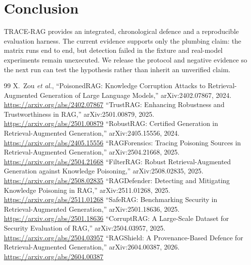 \documentclass[conference]{IEEEtran}
\begin{document}
\section{Conclusion}
TRACE-RAG provides an integrated, chronological defence and a reproducible
evaluation harness. The current evidence supports only the plumbing claim: the
matrix runs end to end, but detection failed in the fixture and real-model
experiments remain unexecuted. We release the protocol and negative evidence so
the next run can test the hypothesis rather than inherit an unverified claim.
\begin{thebibliography}{99}
 X.~Zou \emph{et al.}, ``PoisonedRAG: Knowledge Corruption Attacks to Retrieval-Augmented Generation of Large Language Models,'' arXiv:2402.07867, 2024. \url{https://arxiv.org/abs/2402.07867}
 ``TrustRAG: Enhancing Robustness and Trustworthiness in RAG,'' arXiv:2501.00879, 2025. \url{https://arxiv.org/abs/2501.00879}
 ``RobustRAG: Certified Generation in Retrieval-Augmented Generation,'' arXiv:2405.15556, 2024. \url{https://arxiv.org/abs/2405.15556}
 ``RAGForensics: Tracing Poisoning Sources in Retrieval-Augmented Generation,'' arXiv:2504.21668, 2025. \url{https://arxiv.org/abs/2504.21668}
 ``FilterRAG: Robust Retrieval-Augmented Generation against Knowledge Poisoning,'' arXiv:2508.02835, 2025. \url{https://arxiv.org/abs/2508.02835}
 ``RAGDefender: Detecting and Mitigating Knowledge Poisoning in RAG,'' arXiv:2511.01268, 2025. \url{https://arxiv.org/abs/2511.01268}
 ``SafeRAG: Benchmarking Security in Retrieval-Augmented Generation,'' arXiv:2501.18636, 2025. \url{https://arxiv.org/abs/2501.18636}
 ``CorruptRAG: A Large-Scale Dataset for Security Evaluation of RAG,'' arXiv:2504.03957, 2025. \url{https://arxiv.org/abs/2504.03957}
 ``RAGShield: A Provenance-Based Defence for Retrieval-Augmented Generation,'' arXiv:2604.00387, 2026. \url{https://arxiv.org/abs/2604.00387}
\end{thebibliography}
\end{document}
